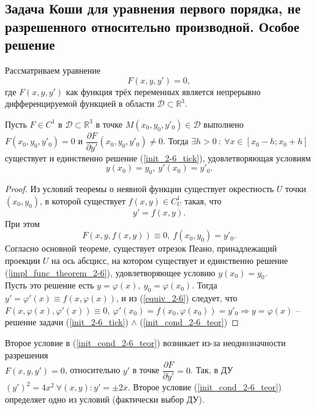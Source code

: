 \subsection{Задача Коши для уравнения первого порядка, не разрешенного относительно производной. Особое решение}
Рассматриваем уравнение
\begin{equation}\label{init_2-6_tick}
    F(x, y, y') = 0,
\end{equation}
где $F(x, y, y')$ как функция трёх переменных является непрерывно дифференцируемой функцией в области $\mathcal{D} \subset \mathbb{R}^3$.
\begin{theorem}
    Пусть $F \in C^1$ в $\mathcal{D} \subset \mathbb{R}^3$ в точке $M(x_0, y_0, y'_0) \in \mathcal{D}$ выполнено $F(x_0, y_0, y'_0) = 0$ и $\dfrac{\partial F}{\partial y'}(x_0, y_0, y'_0) \neq 0$. Тогда $\exists h > 0\ : \ \forall x \in [x_0 - h; x_0 + h]$ существует и единственно решение (\ref{init_2-6_tick}), удовлетворяющая условиям
\begin{equation}\label{init_cond_2-6_teor}
    y(x_0) = y_0,\ y'(x_0) = y'_0.
\end{equation}		
\end{theorem}
\begin{proof}
    Из условий теоремы о неявной функции существует окрестность $U$ точки $(x_0, y_0)$, в которой существует $f(x, y) \in C^1_U$ такая, что
    \begin{equation}\label{impl_func_theorem_2-6}
        y' = f(x, y).
    \end{equation}
    При этом
    \begin{equation} \label{equiv_2-6}
        F(x, y, f(x, y)) \equiv 0,\ f(x_0, y_0) = y'_0.
    \end{equation}
    Согласно основной теореме, существует отрезок Пеано, принадлежащий проекции $U$ на ось абсцисс, на котором существует и единственно решение (\ref{impl_func_theorem_2-6}), удовлетворяющее условию $y(x_0) = y_0$.\\
    Пусть это решение есть $y = \varphi(x),\ y_0 = \varphi(x_0)$. Тогда $y' = \varphi'(x) \equiv f (x, \varphi(x))$, и из (\ref{equiv_2-6}) следует, что $F(x, \varphi(x), \varphi'(x)) \equiv 0,\ \varphi'(x_0) = f(x_0, \varphi(x_0)) = y'_0 \Rightarrow y = \varphi(x)$ -- решение задачи (\ref{init_2-6_tick}) $\wedge$ (\ref{init_cond_2-6_teor})
\end{proof}
\begin{remark}
    Второе условие в (\ref{init_cond_2-6_teor}) возникает из-за неоднозначности разрешения \\ $F(x, y, y') = 0$, относительно $y'$ в точке $\dfrac{\partial F}{\partial y'} = 0$. Так, в ДУ $(y')^2 = 4x^2\ \forall(x, y) : y' = \pm2x$. Второе условие (\ref{init_cond_2-6_teor}) определяет одно из условий (фактически выбор ДУ).
\end{remark} 
